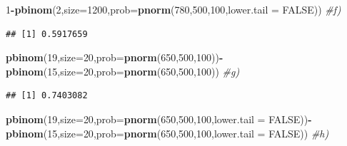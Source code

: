 \documentclass[
]{article}
\newenvironment{Shaded}{\begin{snugshade}}{\end{snugshade}}
\newcommand{\AttributeTok}[1]{\textcolor[rgb]{0.13,0.29,0.53}{#1}}
\newcommand{\CommentTok}[1]{\textcolor[rgb]{0.56,0.35,0.01}{\textit{#1}}}
\newcommand{\ConstantTok}[1]{\textcolor[rgb]{0.56,0.35,0.01}{#1}}
\newcommand{\DecValTok}[1]{\textcolor[rgb]{0.00,0.00,0.81}{#1}}
\newcommand{\FunctionTok}[1]{\textcolor[rgb]{0.13,0.29,0.53}{\textbf{#1}}}
\newcommand{\NormalTok}[1]{#1}
\newcommand{\SpecialCharTok}[1]{\textcolor[rgb]{0.81,0.36,0.00}{\textbf{#1}}}
\begin{document}
\begin{Shaded}
\begin{Highlighting}[]
\DecValTok{1}\SpecialCharTok{{-}}\FunctionTok{pbinom}\NormalTok{(}\DecValTok{2}\NormalTok{,}\AttributeTok{size=}\DecValTok{1200}\NormalTok{,}\AttributeTok{prob=}\FunctionTok{pnorm}\NormalTok{(}\DecValTok{780}\NormalTok{,}\DecValTok{500}\NormalTok{,}\DecValTok{100}\NormalTok{,}\AttributeTok{lower.tail =} \ConstantTok{FALSE}\NormalTok{)) }\CommentTok{\#f)}
\end{Highlighting}
\end{Shaded}

\begin{verbatim}
## [1] 0.5917659
\end{verbatim}

\begin{Shaded}
\begin{Highlighting}[]
\FunctionTok{pbinom}\NormalTok{(}\DecValTok{19}\NormalTok{,}\AttributeTok{size=}\DecValTok{20}\NormalTok{,}\AttributeTok{prob=}\FunctionTok{pnorm}\NormalTok{(}\DecValTok{650}\NormalTok{,}\DecValTok{500}\NormalTok{,}\DecValTok{100}\NormalTok{))}\SpecialCharTok{{-}}\FunctionTok{pbinom}\NormalTok{(}\DecValTok{15}\NormalTok{,}\AttributeTok{size=}\DecValTok{20}\NormalTok{,}\AttributeTok{prob=}\FunctionTok{pnorm}\NormalTok{(}\DecValTok{650}\NormalTok{,}\DecValTok{500}\NormalTok{,}\DecValTok{100}\NormalTok{)) }\CommentTok{\#g)}
\end{Highlighting}
\end{Shaded}

\begin{verbatim}
## [1] 0.7403082
\end{verbatim}

\begin{Shaded}
\begin{Highlighting}[]
\FunctionTok{pbinom}\NormalTok{(}\DecValTok{19}\NormalTok{,}\AttributeTok{size=}\DecValTok{20}\NormalTok{,}\AttributeTok{prob=}\FunctionTok{pnorm}\NormalTok{(}\DecValTok{650}\NormalTok{,}\DecValTok{500}\NormalTok{,}\DecValTok{100}\NormalTok{,}\AttributeTok{lower.tail =} \ConstantTok{FALSE}\NormalTok{))}\SpecialCharTok{{-}}\FunctionTok{pbinom}\NormalTok{(}\DecValTok{15}\NormalTok{,}\AttributeTok{size=}\DecValTok{20}\NormalTok{,}\AttributeTok{prob=}\FunctionTok{pnorm}\NormalTok{(}\DecValTok{650}\NormalTok{,}\DecValTok{500}\NormalTok{,}\DecValTok{100}\NormalTok{,}\AttributeTok{lower.tail =} \ConstantTok{FALSE}\NormalTok{)) }\CommentTok{\#h)}
\end{Highlighting}
\end{Shaded}
\end{document}
